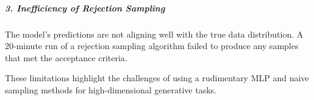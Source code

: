 \documentclass[11pt]{article}
\begin{document}
\hypertarget{inefficiency-of-rejection-sampling}{%
\subparagraph{3. Inefficiency of Rejection
Sampling}\label{inefficiency-of-rejection-sampling}}

The model's predictions are not aligning well with the true data
distribution. A 20-minute run of a rejection sampling algorithm failed
to produce any samples that met the acceptance criteria.

These limitations highlight the challenges of using a rudimentary MLP
and naive sampling methods for high-dimensional generative tasks.

    


    
    
    
\end{document}
